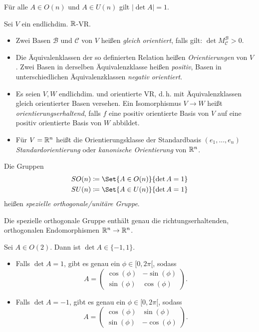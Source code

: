 \documentclass{cheat-sheet}
\newcommand{\BB}{\mathcal{B}}
\newcommand{\BC}{\mathcal{C}}
\begin{document}
\begin{bem}
  Für alle $A \in O(n)$ und $A \in U(n)$ gilt $| \det A | = 1$.
\end{bem}

\begin{definition}
Sei $V$ ein endlichdim. $\mathbb{R}$-VR.
\begin{itemize}
  \item Zwei Basen $\BB$ und $\BC$ von $V$ heißen \emph{gleich orientiert}, falls gilt: $\det M_{\BC}^{\BB} > 0$.
  \item Die Äquivalenklassen der so definierten Relation heißen \emph{Orientierungen} von $V$. Zwei Basen in derselben Äquivalenzklasse heißen \emph{positiv}, Basen in unterschiedlichen Äquivalenzklassen \emph{negativ orientiert}.
  \item Es seien $V, W$ endlichdim. und orientierte VR, d.\,h. mit Äquivalenzklassen gleich orientierter Basen versehen. Ein Isomorphismus $V \to W$ heißt \emph{orientierungserhaltend}, falls $f$ eine positiv orientierte Basis von $V$ auf eine positiv orientierte Basis von $W$ abbildet.
  \item Für $V = \mathbb{R}^n$ heißt die Orientierungsklasse der Standardbasis $(e_1, ..., e_n)$ \emph{Standardorientierung} oder \emph{kanonische Orientierung} von $\mathbb{R}^n$.
\end{itemize}
\end{definition}

\begin{definition}
Die Gruppen
\begin{align*}
SO(n) \coloneqq \Set{ A \in O(n) }{ \det A = 1 } \\
SU(n) \coloneqq \Set{ A \in U(n) }{ \det A = 1 }
\end{align*}
heißen \emph{spezielle orthogonale/unitäre Gruppe}.
\end{definition}

\begin{bem}
Die spezielle orthogonale Gruppe enthält genau die richtungserhaltenden, orthogonalen Endomorphismen $\mathbb{R}^n \to \mathbb{R}^n$.
\end{bem}

\begin{satz}
Sei $A \in O(2)$. Dann ist $\det A \in \{ -1, 1 \}$.
\begin{itemize}
  \item Falls $\det A = 1$, gibt es genau ein $\phi \in [0, 2 \pi[$, sodass
  \[ A = \begin{pmatrix} \cos(\phi) & - \sin(\phi) \\ \sin(\phi) & \cos(\phi) \end{pmatrix}. \]
  \item Falls $\det A = -1$, gibt es genau ein $\phi \in [0, 2 \pi[$, sodass
  \[ A = \begin{pmatrix} \cos(\phi) & \sin(\phi) \\ \sin(\phi) & - \cos(\phi) \end{pmatrix}. \]
\end{itemize}
\end{satz}
\end{document}
